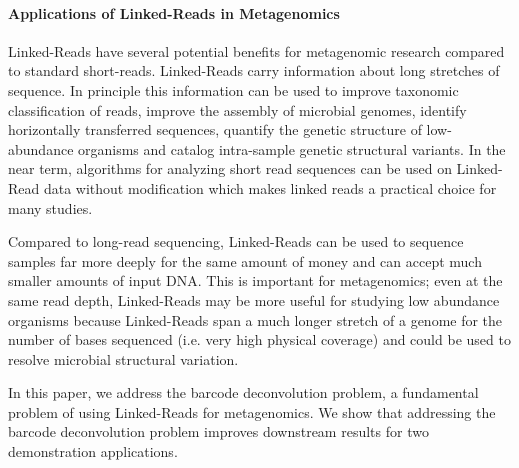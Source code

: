 % 
% 





\paragraph{Applications of Linked-Reads in Metagenomics}

Linked-Reads have several potential benefits for metagenomic research compared to standard short-reads. Linked-Reads carry information about long stretches of sequence. In principle this information can be used to improve taxonomic classification of reads, improve the assembly of microbial genomes, identify horizontally transferred sequences, quantify the genetic structure of low-abundance organisms and catalog intra-sample genetic structural variants. In the near term, algorithms for analyzing short read sequences can be used on Linked-Read data without modification which makes linked reads a practical choice for many studies.

Compared to long-read sequencing, Linked-Reads can be used to sequence samples far more deeply for the same amount of money and can accept much smaller amounts of input DNA. This is important for metagenomics; even at the same read depth, Linked-Reads may be more useful for studying low abundance organisms because Linked-Reads span a much longer stretch of a genome for the number of bases sequenced (i.e. very high physical coverage) and could be used to resolve microbial structural variation.

In this paper, we address the barcode deconvolution problem, a fundamental problem of using Linked-Reads for metagenomics. We show that addressing the barcode deconvolution problem improves downstream results for two demonstration applications.

